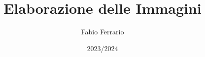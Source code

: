 \documentclass[12pt, a4paper, openany]{book}
\begin{document}
\title{Elaborazione delle Immagini}
\author{Fabio Ferrario}
\date{2023/2024}
\maketitle

\tableofcontents



\end{document}
